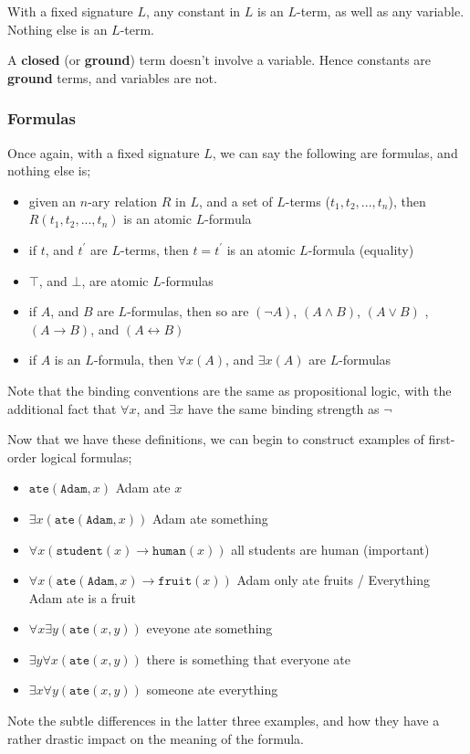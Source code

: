 \documentclass[a4paper, 12pt]{article}
\begin{document}
        With a fixed signature $L$, any constant in $L$ is an $L$-term, as well as any variable. Nothing else is an $L$-term.
        \smallskip

        A \textbf{closed} (or \textbf{ground}) term doesn't involve a variable. Hence constants are \textbf{ground} terms, and variables are not.

        \subsubsection*{Formulas}
        Once again, with a fixed signature $L$, we can say the following are formulas, and nothing else is;
        \begin{itemize}
            \item given an $n$-ary relation $R$ in $L$, and a set of $L$-terms ($t_1, t_2, ..., t_n$), then $R(t_1, t_2, ..., t_n)$ is an atomic $L$-formula
            \item if $t$, and $t^\prime$ are $L$-terms, then $t = t^\prime$ is an atomic $L$-formula (equality)
            \item $\top$, and $\bot$, are atomic $L$-formulas
            \item if $A$, and $B$ are $L$-formulas, then so are $(\neg A)$, $(A \land B)$, $(A \lor B)$ , $(A \rightarrow B)$, and $(A \leftrightarrow B)$
            \item if $A$ is an $L$-formula, then $\forall x (A)$, and $\exists x (A)$ are $L$-formulas
        \end{itemize}
        Note that the binding conventions are the same as propositional logic, with the additional fact that $\forall x$, and $\exists x$ have the same binding strength as $\neg$
        \medskip

        Now that we have these definitions, we can begin to construct examples of first-order logical formulas;
        \begin{itemize}
            \item $\texttt{ate}(\texttt{Adam}, x)$ \hfill Adam ate $x$
            \item $\exists x (\texttt{ate}(\texttt{Adam}, x))$ \hfill Adam ate something
            \item $\forall x (\texttt{student}(x) \rightarrow \texttt{human}(x))$ \hfill all students are human (important)
            \item $\forall x (\texttt{ate}(\texttt{Adam}, x) \rightarrow \texttt{fruit}(x))$ \hfill Adam only ate fruits / Everything Adam ate is a fruit
            \item $\forall x \exists y (\texttt{ate}(x, y))$ \hfill eveyone ate something
            \item $\exists y \forall x (\texttt{ate}(x, y))$ \hfill there is something that everyone ate
            \item $\exists x \forall y (\texttt{ate}(x, y))$ \hfill someone ate everything
        \end{itemize}
        Note the subtle differences in the latter three examples, and how they have a rather drastic impact on the meaning of the formula.
\end{document}
